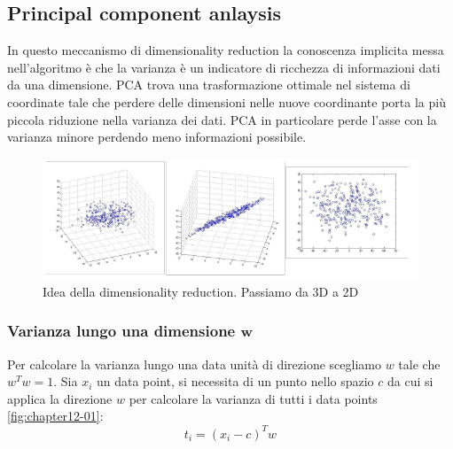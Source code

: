	\subsection{Principal component anlaysis}
	In questo meccanismo di dimensionality reduction la conoscenza implicita messa nell'algoritmo \`e che la varianza \`e un indicatore di ricchezza di informazioni dati da una dimensione.
	PCA trova una trasformazione ottimale nel sistema di coordinate tale che perdere delle dimensioni nelle nuove coordinante porta la pi\`u piccola riduzione nella varianza dei dati.
	PCA in particolare  perde l'asse con la varianza minore perdendo meno informazioni possibile.
	
	\begin{figure}
		\centering
		\includegraphics[width=0.6\linewidth]{imgs/chapter12/img0}
		\caption{Idea della dimensionality reduction. Passiamo da 3D a 2D}
		\label{fig:chapter12-00}
	\end{figure}

		\subsubsection{Varianza lungo una dimensione $\mathbf{w}$}
		Per calcolare la varianza lungo una data unit\`a di direzione scegliamo $w$ tale che $w^Tw=1$.
		Sia $x_i$ un data point, si necessita di un punto nello spazio $c$ da cui si applica la direzione $w$ per calcolare la varianza di tutti i data points \ref{fig:chapter12-01}:
		$$t_i = (x_i-c)^Tw$$
		
